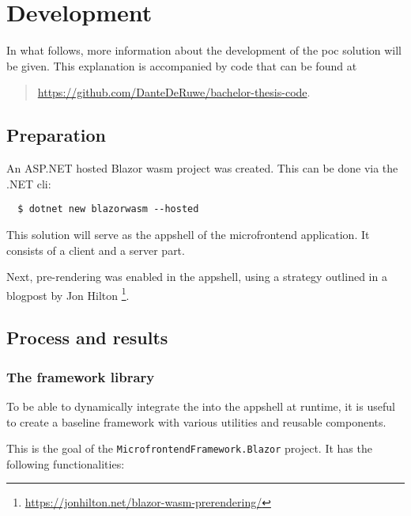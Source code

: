 \section{Development}
\label{sec:poc-development}

In what follows, more information about the development of the \gls{poc}
solution will be given. This explanation is accompanied by code that can be
found at
\begin{quote}
   \url{https://github.com/DanteDeRuwe/bachelor-thesis-code}.
\end{quote}

\subsection{Preparation}

An ASP.NET hosted Blazor \gls{wasm} project was created. This can be done via
the .NET \gls{cli}:

\begin{verbatim}
  $ dotnet new blazorwasm --hosted
\end{verbatim}

This solution will serve as the \gls{appshell} of the \gls{microfrontend}
application. It consists of a client and a server part.

Next, pre-rendering was enabled in the \gls{appshell}, using a strategy outlined
in a blogpost by Jon Hilton
\footnote{\url{https://jonhilton.net/blazor-wasm-prerendering/}}.

\subsection{Process and results}

\subsubsection{The framework library}

To be able to dynamically integrate the  into the
\gls{appshell} at runtime, it is useful to create a baseline framework with
various utilities and reusable components.

This is the goal of the
\texttt{MicrofrontendFramework.Blazor}
project. It has the following functionalities:

